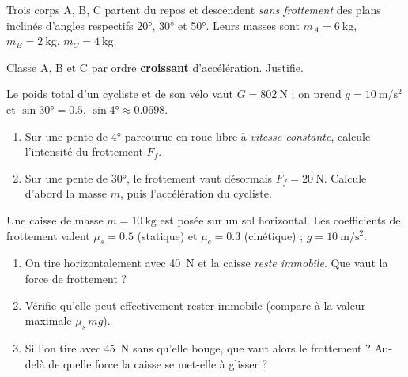 \documentclass[11pt,a4paper]{article}
\begin{document}

\begin{exo}
Trois corps A, B, C partent du repos et descendent \emph{sans frottement} des plans inclinés d'angles
respectifs \ang{20}, \ang{30} et \ang{50}. Leurs masses sont $m_A=\qty{6}{\kilogram}$,
$m_B=\qty{2}{\kilogram}$, $m_C=\qty{4}{\kilogram}$.
\begin{center}
\end{center}
Classe A, B et C par ordre \textbf{croissant} d'accélération. Justifie.
\end{exo}

\begin{exo}
Le poids total d'un cycliste et de son vélo vaut $G=\qty{802}{\newton}$ ; on prend
$g=\qty{10}{\metre\per\second\squared}$ et $\sin\ang{30}=\num{0,5}$, $\sin\ang{4}\approx\num{0,0698}$.
\begin{enumerate}[label=\alph*)]
  \item Sur une pente de \ang{4} parcourue en roue libre à \emph{vitesse constante}, calcule l'intensité du frottement $F_f$.
  \item Sur une pente de \ang{30}, le frottement vaut désormais $F_f=\qty{20}{\newton}$. Calcule d'abord la masse $m$, puis l'accélération du cycliste.
\end{enumerate}
\end{exo}

\begin{exo}
Une caisse de masse $m=\qty{10}{\kilogram}$ est posée sur un sol horizontal. Les coefficients de
frottement valent $\mu_s=\num{0,5}$ (statique) et $\mu_c=\num{0,3}$ (cinétique) ; $g=\qty{10}{\metre\per\second\squared}$.
\begin{enumerate}[label=\alph*)]
  \item On tire horizontalement avec \qty{40}{\newton} et la caisse \emph{reste immobile}. Que vaut la force de frottement ?
  \item Vérifie qu'elle peut effectivement rester immobile (compare à la valeur maximale $\mu_s\, mg$).
  \item Si l'on tire avec \qty{45}{\newton} sans qu'elle bouge, que vaut alors le frottement ? Au-delà de quelle force la caisse se met-elle à glisser ?
\end{enumerate}
\end{exo}
\end{document}
